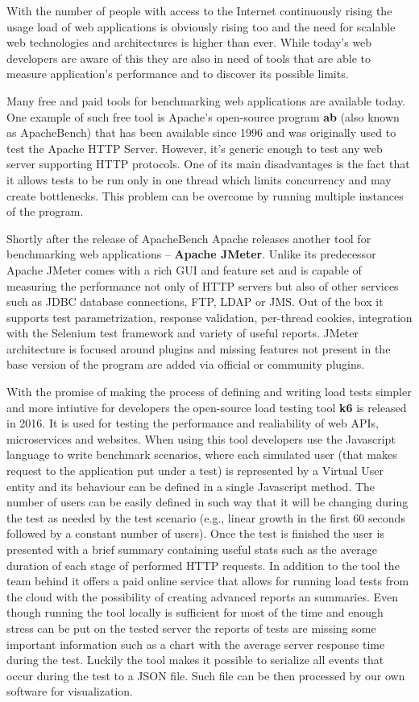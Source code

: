 \documentclass[12pt, a4paper]{article}
\begin{document}
With the number of people with access to the Internet continuously rising the usage load of web applications is obviously rising too and the need for scalable web technologies and architectures is higher than ever.
While today's web developers are aware of this they are also in need of tools that are able to measure application's performance and to discover its possible limits.

Many free and paid tools for benchmarking web applications are available today.
One example of such free tool is Apache's open-source program \textbf{ab} (also known as ApacheBench) that has been available since 1996 and was originally used to test the Apache HTTP Server.
However, it's generic enough to test any web server supporting HTTP protocols.
One of its main disadvantages is the fact that it allows tests to be run only in one thread which limits concurrency and may create bottlenecks.
This problem can be overcome by running multiple instances of the program.

Shortly after the release of ApacheBench Apache releases another tool for benchmarking web applications -- \textbf{Apache JMeter}.
Unlike its predecessor Apache JMeter comes with a rich GUI and feature set and is capable of measuring the performance not only of HTTP servers but also of other services such as JDBC database connections, FTP, LDAP or JMS.
Out of the box it supports test parametrization, response validation, per-thread cookies, integration with the Selenium test framework and variety of useful reports.
JMeter architecture is focused around plugins and missing features not present in the base version of the program are added via official or community plugins.

With the promise of making the process of defining and writing load tests simpler and more intiutive for developers the open-source load testing tool \textbf{k6} is released in 2016.
It is used for testing the performance and realiability of web APIs, microservices and websites.
When using this tool developers use the Javascript language to write benchmark scenarios, where each simulated user (that makes request to the application put under a test) is represented by a Virtual User entity and its behaviour can be defined in a single Javascript method.
The number of users can be easily defined in such way that it will be changing during the test as needed by the test scenario (e.g., linear growth in the first 60 seconds followed by a constant number of users).
Once the test is finished the user is presented with a brief summary containing useful stats such as the average duration of each stage of performed HTTP requests.
In addition to the tool the team behind it offers a paid online service that allows for running load tests from the cloud with the possibility of creating advanced reports an summaries.
Even though running the tool locally is sufficient for most of the time and enough stress can be put on the tested server the reports of tests are missing some important information such as a chart with the average server response time during the test.
Luckily the tool makes it possible to serialize all events that occur during the test to a JSON file.
Such file can be then processed by our own software for visualization. 
\end{document}
